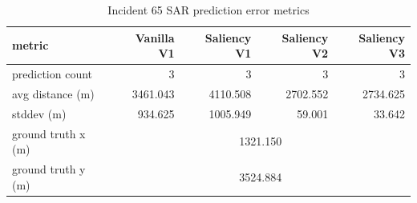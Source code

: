 \begin{table}[ht]
\centering
\caption{Incident 65 SAR prediction error metrics}
\label{tab:sar-incident-65}
\begin{tabular}{lrrrr}
\hline
metric & Vanilla V1 & Saliency V1 & Saliency V2 & Saliency V3 \\
\hline
prediction count & 3 & 3 & 3 & 3 \\
avg distance (m) & 3461.043 & 4110.508 & 2702.552 & 2734.625 \\
stddev (m) & 934.625 & 1005.949 & 59.001 & 33.642 \\
ground truth x (m) & \multicolumn{4}{c}{1321.150} \\
ground truth y (m) & \multicolumn{4}{c}{3524.884} \\
\hline
\end{tabular}
\end{table}
